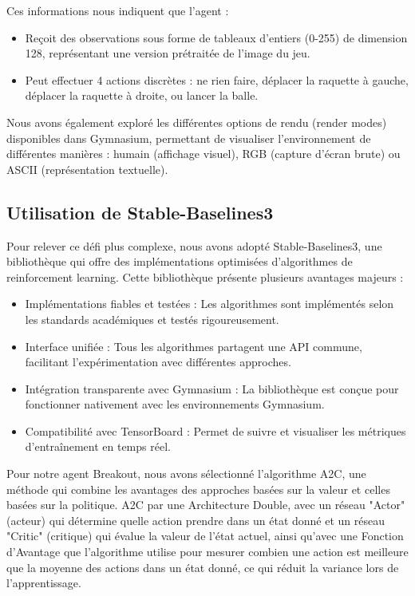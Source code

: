 \documentclass{article}
\begin{document}
Ces informations nous indiquent que l'agent :
\begin{itemize} 
    \item Reçoit des observations sous forme de tableaux d'entiers (0-255) de dimension 128, représentant une version prétraitée de l'image du jeu.
    \item Peut effectuer 4 actions discrètes : ne rien faire, déplacer la raquette à gauche, déplacer la raquette à droite, ou lancer la balle.
\end{itemize}

Nous avons également exploré les différentes options de rendu (render modes) disponibles dans Gymnasium, permettant de visualiser l'environnement de différentes manières : humain (affichage visuel), RGB (capture d'écran brute) ou ASCII (représentation textuelle).

\subsection{Utilisation de Stable-Baselines3}

\quad Pour relever ce défi plus complexe, nous avons adopté Stable-Baselines3, une bibliothèque qui offre des implémentations optimisées d'algorithmes de reinforcement learning. Cette bibliothèque présente plusieurs avantages majeurs :
\begin{itemize} 
    \item Implémentations fiables et testées : Les algorithmes sont implémentés selon les standards académiques et testés rigoureusement.
    \item Interface unifiée : Tous les algorithmes partagent une API commune, facilitant l'expérimentation avec différentes approches.
    \item Intégration transparente avec Gymnasium : La bibliothèque est conçue pour fonctionner nativement avec les environnements Gymnasium.
    \item Compatibilité avec TensorBoard : Permet de suivre et visualiser les métriques d'entraînement en temps réel.
\end{itemize}

Pour notre agent Breakout, nous avons sélectionné l'algorithme A2C, une méthode qui combine les avantages des approches basées sur la valeur et celles basées sur la politique. A2C par une Architecture Double, avec un réseau "Actor" (acteur) qui détermine quelle action prendre dans un état donné et un réseau "Critic" (critique) qui évalue la valeur de l'état actuel, ainsi qu'avec une Fonction d'Avantage que l'algorithme utilise pour mesurer combien une action est meilleure que la moyenne des actions dans un état donné, ce qui réduit la variance lors de l'apprentissage.
\end{document}
